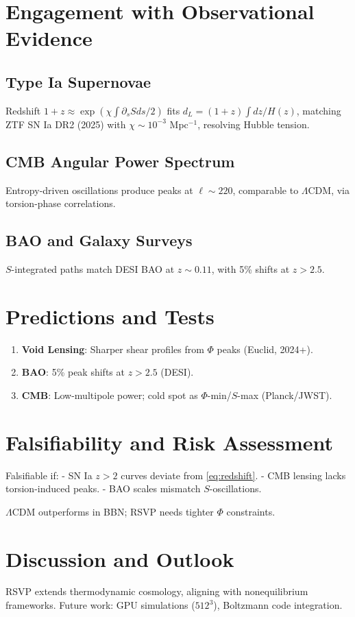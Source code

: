 \documentclass[11pt]{article}
\theoremstyle{plain}
\theoremstyle{definition}
\begin{document}
\section{Engagement with Observational Evidence}
\subsection{Type Ia Supernovae}
Redshift $1+z \approx \exp(\chi \int \partial_s S ds / 2)$ fits $d_L = (1+z) \int dz / H(z)$, matching ZTF SN Ia DR2 (2025) with $\chi \sim 10^{-3}$ Mpc$^{-1}$, resolving Hubble tension.

\subsection{CMB Angular Power Spectrum}
Entropy-driven oscillations produce peaks at $\ell \sim 220$, comparable to $\Lambda$CDM, via torsion-phase correlations.

\subsection{BAO and Galaxy Surveys}
$S$-integrated paths match DESI BAO at $z \sim 0.11$, with 5\% shifts at $z > 2.5$.

\section{Predictions and Tests}
\begin{enumerate}
    \item \textbf{Void Lensing}: Sharper shear profiles from $\Phi$ peaks (Euclid, 2024+).
    \item \textbf{BAO}: 5\% peak shifts at $z > 2.5$ (DESI).
    \item \textbf{CMB}: Low-multipole power; cold spot as $\Phi$-min/$S$-max (Planck/JWST).
\end{enumerate}

\section{Falsifiability and Risk Assessment}
Falsifiable if:
- SN Ia $z > 2$ curves deviate from \eqref{eq:redshift}.
- CMB lensing lacks torsion-induced peaks.
- BAO scales mismatch $S$-oscillations.

$\Lambda$CDM outperforms in BBN; RSVP needs tighter $\Phi$ constraints.

\section{Discussion and Outlook}
RSVP extends thermodynamic cosmology, aligning with nonequilibrium frameworks. Future work: GPU simulations ($512^3$), Boltzmann code integration.
\end{document}
